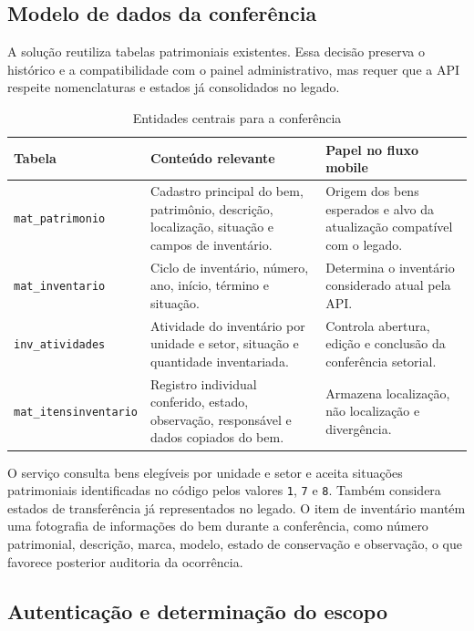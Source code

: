 \documentclass[12pt,a4paper]{article}
\begin{document}
\subsection{Modelo de dados da conferência}

A solução reutiliza tabelas patrimoniais existentes. Essa decisão preserva o
histórico e a compatibilidade com o painel administrativo, mas requer que a
API respeite nomenclaturas e estados já consolidados no legado.

\begin{table}[H]
\centering
\caption{Entidades centrais para a conferência}
\label{tab:entidades}
\small
\begin{tabularx}{\textwidth}{L{3.5cm} Y Y}
\toprule
\textbf{Tabela} & \textbf{Conteúdo relevante} & \textbf{Papel no fluxo mobile} \\
\midrule
\texttt{mat\_patrimonio} & Cadastro principal do bem, patrimônio, descrição,
localização, situação e campos de inventário. & Origem dos bens esperados e
alvo da atualização compatível com o legado. \\
\texttt{mat\_inventario} & Ciclo de inventário, número, ano, início, término
e situação. & Determina o inventário considerado atual pela API. \\
\texttt{inv\_atividades} & Atividade do inventário por unidade e setor,
situação e quantidade inventariada. & Controla abertura, edição e conclusão da
conferência setorial. \\
\texttt{mat\_itensinventario} & Registro individual conferido, estado,
observação, responsável e dados copiados do bem. & Armazena localização, não
localização e divergência. \\
\bottomrule
\end{tabularx}
\end{table}

O serviço consulta bens elegíveis por unidade e setor e aceita situações
patrimoniais identificadas no código pelos valores \texttt{1}, \texttt{7} e
\texttt{8}. Também considera estados de transferência já representados no
legado. O item de inventário mantém uma fotografia de informações do bem
durante a conferência, como número patrimonial, descrição, marca, modelo,
estado de conservação e observação, o que favorece posterior auditoria da
ocorrência.

\subsection{Autenticação e determinação do escopo}
\end{document}
